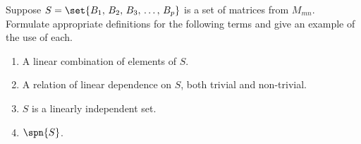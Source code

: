 Suppose $S=\set{B_1,\,B_2,\,B_3,\,\ldots,\,B_p}$ is a set of matrices from $M_{mn}$.  Formulate appropriate definitions for the following terms and give an example of the use of each.
%
\begin{enumerate}
\item A linear combination of elements of $S$.
\item A relation of linear dependence on $S$, both trivial and non-trivial.
\item $S$ is a linearly independent set.
\item $\spn{S}$.
\end{enumerate}